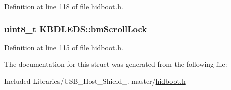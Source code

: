 \-Definition at line 118 of file hidboot.\-h.

\hypertarget{struct_k_b_d_l_e_d_s_adf2e5ff049894e40b0fab7d830f3c393}{
\subsubsection[{bm\-Scroll\-Lock}]{\setlength{\rightskip}{0pt plus 5cm}uint8\-\_\-t {\bf \-K\-B\-D\-L\-E\-D\-S\-::bm\-Scroll\-Lock}}}\label{struct_k_b_d_l_e_d_s_adf2e5ff049894e40b0fab7d830f3c393}


\-Definition at line 115 of file hidboot.\-h.



\-The documentation for this struct was generated from the following file\-:\begin{DoxyCompactItemize}
\item 
\-Included Libraries/\-U\-S\-B\-\_\-\-Host\-\_\-\-Shield\-\_.-\/master/\hyperlink{hidboot_8h}{hidboot.\-h}\end{DoxyCompactItemize}
